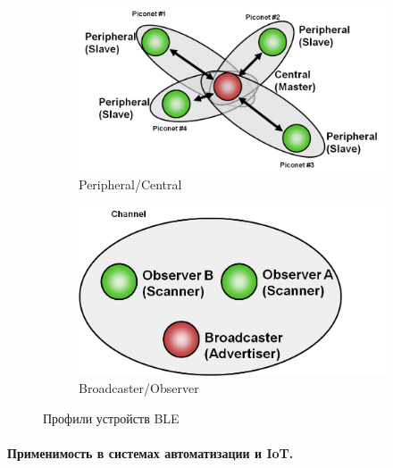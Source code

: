 \documentclass[14pt, a4paper]{extreport}
\begin{document}
\begin{figure}[htbp]
  \centering
    \begin{subfigure}[t]{0.45\textwidth}
    \centering
    \includegraphics[width=\linewidth]{images/BLE-topology-unicast.png}
    \caption{Peripheral/Central}
    \label{fig:fig_BLE_topology_unicast}
  \end{subfigure}
  \begin{subfigure}[t]{0.45\textwidth}
    \centering
    \includegraphics[width=\linewidth]{images/BLE-topology-broadcast.png}
    \caption{Broadcaster/Observer}
    \label{fig:fig_BLE_topology_broadcast}
  \end{subfigure}\hfill
  \caption{Профили устройств BLE\cite{IMG_BLE_topologies}}
  \label{fig:twophotos}
\end{figure}



\paragraph{Применимость в системах автоматизации и IoT.}
\end{document}
